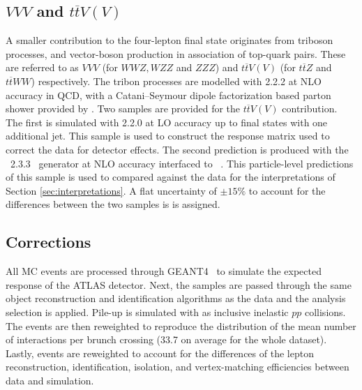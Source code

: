 \subsection{$VVV$ and $t\overline{t}V(V)$}
A smaller contribution to the four-lepton final state originates from triboson processes, and vector-boson production in association of top-quark pairs. These are referred to as $VVV$ (for $WWZ, WZZ$ and $ZZZ$) and $t\overline{t}V(V)$ (for $t\overline{t}Z$ and $t\overline{t}WW$) respectively. The tribon processes are modelled with \SHERPA{} 2.2.2 at NLO accuracy in QCD, with a Catani–Seymour dipole factorization based parton shower provided by \SHERPA{}. Two samples are provided for the  $t\overline{t}V(V)$ contribution. The first is simulated with \SHERPA{} 2.2.0 at LO accuracy up to final states with one additional jet. This sample is used to construct the response matrix used to correct the data for detector effects. The second prediction is produced with the \madgraph~2.3.3~\cite{Alwall:2014hca} generator at NLO accuracy interfaced to ~\cite{Sjostrand:2014zea}. This particle-level predictions of this sample is used to compared against the data for the interpretations of Section \ref{sec:interpretations}. A flat uncertainty of $\pm15\%$ to account for the differences between the two samples is is assigned.

\subsection{Corrections}
All MC events are processed through GEANT4~\cite{Geant4} to simulate the expected response of the ATLAS detector. Next, the samples are passed through the same object reconstruction and identification algorithms as the data and the analysis selection is applied. Pile-up is simulated with  as inclusive inelastic $pp$ collisions. The events are then reweighted to reproduce the distribution of the mean number of interactions per brunch crossing (33.7 on average for the whole dataset). Lastly, events are  reweighted to account for the differences of the lepton reconstruction, identification, isolation, and vertex-matching efficiencies between data and simulation.

